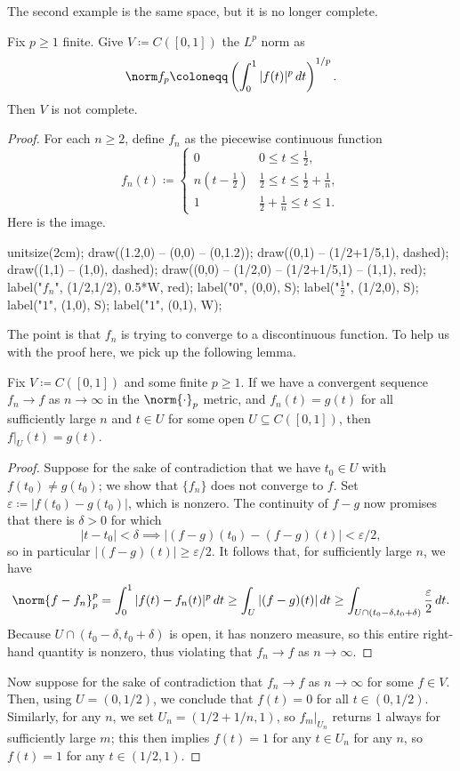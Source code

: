 \documentclass[../notes.tex]{subfiles}
\begin{document}
The second example is the same space, but it is no longer complete.
\begin{example}
	Fix $p\ge1$ finite. Give $V\coloneqq C([0,1])$ the $L^p$ norm as
	\[\norm f_p\coloneqq\left(\int_0^1|f(t)|^p\,dt\right)^{1/p}.\]
	Then $V$ is not complete.
\end{example}
\begin{proof}
	For each $n\ge2$, define $f_n$ as the piecewise continuous function
	\[f_n(t)\coloneqq\begin{cases}
		0 & 0\le t\le \frac12, \\
		n(t-\frac12) & \frac12\le t\le\frac12+\frac1n, \\
		1 & \frac12+\frac1n\le t\le1.
	\end{cases}\]
	Here is the image.
	\begin{center}
		\begin{asy}
			unitsize(2cm);
			draw((1.2,0) -- (0,0) -- (0,1.2));
			draw((0,1) -- (1/2+1/5,1), dashed);
			draw((1,1) -- (1,0), dashed);
			draw((0,0) -- (1/2,0) -- (1/2+1/5,1) -- (1,1), red);
			label("$f_n$", (1/2,1/2), 0.5*W, red);
			label("$0$", (0,0), S);
			label("$\frac12$", (1/2,0), S);
			label("$1$", (1,0), S);
			label("$1$", (0,1), W);
		\end{asy}
	\end{center}
	The point is that $f_n$ is trying to converge to a discontinuous function. To help us with the proof here, we pick up the following lemma.
	\begin{lemma}
		Fix $V\coloneqq C([0,1])$ and some finite $p\ge1$. If we have a convergent sequence $f_n\to f$ as $n\to\infty$ in the $\norm{\cdot}_p$ metric, and $f_n(t)=g(t)$ for all sufficiently large $n$ and $t\in U$ for some open $U\subseteq C([0,1])$, then $f|_U(t)=g(t)$.
	\end{lemma}
	\begin{proof}
		Suppose for the sake of contradiction that we have $t_0\in U$ with $f(t_0)\ne g(t_0)$; we show that $\{f_n\}$ does not converge to $f$. Set $\varepsilon\coloneqq|f(t_0)-g(t_0)|$, which is nonzero. The continuity of $f-g$ now promises that there is $\delta>0$ for which
		\[|t-t_0|<\delta\implies|(f-g)(t_0)-(f-g)(t)|<\varepsilon/2,\]
		so in particular $|(f-g)(t)|\ge\varepsilon/2$. It follows that, for sufficiently large $n$, we have
		\[\norm{f-f_n}_p^p=\int_0^1|f(t)-f_n(t)|^p\,dt\ge\int_U|(f-g)(t)|\,dt\ge\int_{U\cap(t_0-\delta,t_0+\delta)}\frac\varepsilon2\,dt.\]
		Because $U\cap(t_0-\delta,t_0+\delta)$ is open, it has nonzero measure, so this entire right-hand quantity is nonzero, thus violating that $f_n\to f$ as $n\to\infty$.
	\end{proof}
	Now suppose for the sake of contradiction that $f_n\to f$ as $n\to\infty$ for some $f\in V$. Then, using $U=(0,1/2)$, we conclude that $f(t)=0$ for all $t\in(0,1/2)$. Similarly, for any $n$, we set $U_n=(1/2+1/n,1)$, so $f_m|_{U_n}$ returns $1$ always for sufficiently large $m$; this then implies $f(t)=1$ for any $t\in U_n$ for any $n$, so $f(t)=1$ for any $t\in(1/2,1)$.


\end{proof}
\end{document}
